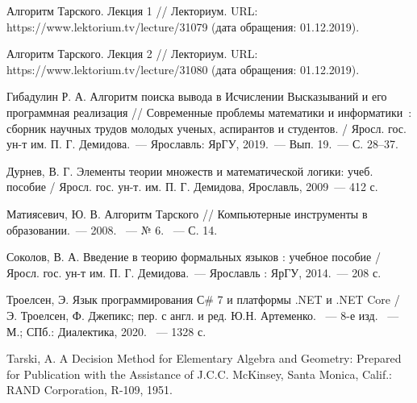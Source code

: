 \begin{thebibliography}{99}
    Алгоритм Тарского. Лекция 1 // Лекториум. URL: https://www.lektorium.tv/lecture/31079 (дата обращения: 01.12.2019).

    Алгоритм Тарского. Лекция 2 // Лекториум. URL: https://www.lektorium.tv/lecture/31080 (дата обращения: 01.12.2019).

    Гибадулин Р. А. Алгоритм поиска вывода в Исчислении Высказываний и его программная реализация // Современные проблемы математики и информатики~: сборник научных трудов молодых ученых, аспирантов и студентов. / Яросл. гос. ун-т им. П. Г. Демидова.~--- Ярославль: ЯрГУ, 2019.~--- Вып. 19.~--- С. 28--37.

    Дурнев, В. Г. Элементы теории множеств и математической логики: учеб. пособие / Яросл. гос. ун-т. им. П. Г. Демидова, Ярославль, 2009~--- 412 с.

    Матиясевич, Ю. В. Алгоритм Тарского // Компьютерные инструменты в образовании.~--- 2008. ~--- № 6. ~--- С. 14.

    Соколов, В. А. Введение в теорию формальных языков : учебное пособие / Яросл. гос. ун-т им. П. Г. Демидова.~--- Ярославль : ЯрГУ, 2014.~--- 208 с.

    Троелсен, Э. Язык программирования С\# 7 и платформы .NET и .NET Core / Э. Троелсен, Ф. Джепикс; пер. с англ. и ред. Ю.Н. Артеменко. ~--- 8-е изд. ~--- М.; СПб.: Диалектика, 2020. ~--- 1328 с.

    Tarski, A. A Decision Method for Elementary Algebra and Geometry: Prepared for Publication with the Assistance of J.C.C. McKinsey, Santa Monica, Calif.: RAND Corporation, R-109, 1951. 

\end{thebibliography}

